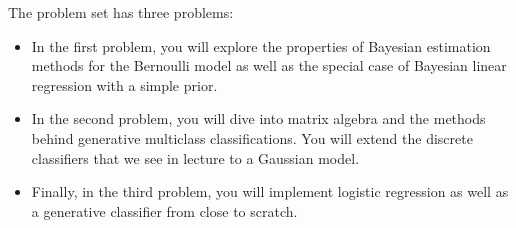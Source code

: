 \documentclass[submit]{harvardml}
\begin{document}
The problem set has three problems: 
\begin{itemize}
\item In the first problem, you will explore the properties of Bayesian
estimation methods for the Bernoulli model as well as the special
case of Bayesian linear regression with a simple prior.
%
\item  In the second
problem, you will dive into  matrix algebra and the methods behind
generative multiclass classifications. You will extend the discrete classifiers  
that we see in  lecture to a Gaussian model.
%
\item Finally, in the third problem, you will implement 
 logistic regression as well as a generative classifier 
from close to scratch.
%
\end{itemize}

\newpage
\end{document}
